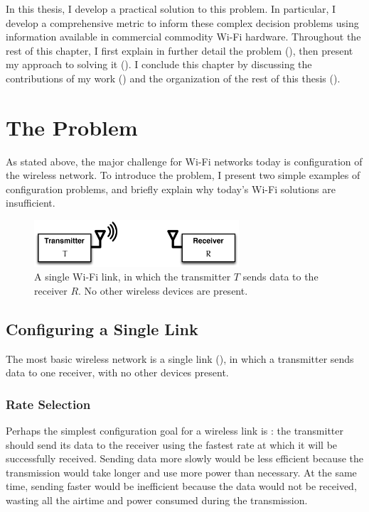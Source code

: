 In this thesis, I develop a practical solution to this problem. In particular, I develop a comprehensive metric to inform these complex decision problems using information available in commercial commodity Wi-Fi hardware. Throughout the rest of this chapter, I first explain in further detail the problem (), then present my approach to solving it (). I conclude this chapter by discussing the contributions of my work () and the organization of the rest of this thesis ().

\section{The Problem}
\label{sec:intro_problem}
As stated above, the major challenge for Wi-Fi networks today is configuration of the wireless network. To introduce the problem, I present two simple examples of configuration problems, and briefly explain why today's Wi-Fi solutions are insufficient.

\begin{figure}[thp]
	\centering
	\includegraphics[width=3in]{figures/single_link}
	\caption{\label{fig:wifi_link}A single Wi-Fi link, in which the transmitter $T$ sends data to the receiver $R$. No other wireless devices are present.}
\end{figure}

\subsection{Configuring a Single Link}
\label{sec:intro_single_link_problems}
The most basic wireless network is a single link (), in which a transmitter sends data to one receiver, with no other devices present.

\subsubsection{Rate Selection}
Perhaps the simplest configuration goal for a wireless link is : the transmitter should send its data to the receiver using the fastest rate at which it will be successfully received. Sending data more slowly would be less efficient because the transmission would take longer and use more power than necessary. At the same time, sending faster would be inefficient because the data would not be received, wasting all the airtime and power consumed during the transmission.

